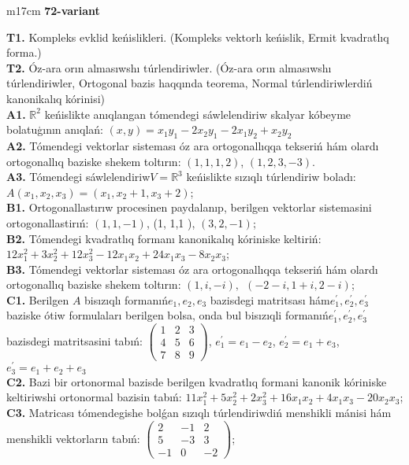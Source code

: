 \documentclass{article}
\begin{document}
\begin{tabular}{m{17cm}}
\textbf{72-variant}
\newline

\textbf{T1.} Kompleks evklid keńislikleri.  (Kompleks vektorlı keńislik, Ermit kvadratlıq forma.) \\
\textbf{T2.} Óz-ara orın almasıwshı túrlendiriwler. (Óz-ara orın almasıwshı túrlendiriwler,  Ortogonal bazis haqqında teorema,  Normal túrlendiriwlerdiń kanonikalıq kórinisi) \\
\textbf{A1.} \(\mathbb{R}^{2}\) keńislikte anıqlangan tómendegi sáwlelendiriw skalyar kóbeyme bolatuģının anıqlań: \((x,y) = x_{1}y_{1} - 2x_{2}y_{1} - 2x_{1}y_{2} + x_{2}y_{2}\) \\
\textbf{A2.} Tómendegi vektorlar sisteması óz ara ortogonallıqqa tekseriń hám olardı ortogonallıq baziske shekem toltırın: \((1,1,1,2)\), \((1,2,3, - 3)\). \\
\textbf{A3.} Tómendegi sáwlelendiriw\(V = \mathbb{R}^{3}\) keńislikte sızıqlı túrlendiriw boladı: \(A\left( x_{1},x_{2},x_{3} \right) = \left( x_{1},x_{2} + 1,x_{3} + 2 \right)\); \\
\textbf{B1.} Ortogonallastırıw procesinen paydalanıp, berilgen vektorlar sistemasini ortogonallastirıń: \((1,1, - 1)\), (1, 1,1 ), \((3,2, - 1)\); \\
\textbf{B2.} Tómendegi kvadratlıq formanı kanonikalıq kóriniske keltiriń: \(12x_{1}^{2} + 3x_{2}^{2} + 12x_{3}^{2} - 12x_{1}x_{2} + 24x_{1}x_{3} - 8x_{2}x_{3}\); \\
\textbf{B3.} Tómendegi vektorlar sisteması óz ara ortogonallıqqa tekseriń hám olardı ortogonallıq baziske shekem toltırın: \((1,i, - i),\ \ ( - 2 - i,1 + i,2 - i)\); \\
\textbf{C1.} Berilgen \(A\) bisızıqlı formanıń\(e_{1},e_{2},e_{3}\) bazisdegi matritsası hám\(e_{1}^{'},e_{2}^{'},e_{3}^{'}\) baziske ótiw formulaları berilgen bolsa, onda bul bisızıqli formanıń\(e_{1}^{'},e_{2}^{'},e_{3}^{'}\) bazisdegi matritsasini tabıń: \(\begin{pmatrix} 1 & 2 & 3 \\ 4 & 5 & 6 \\ 7 & 8 & 9 \end{pmatrix}\), \(e_{1}^{'} = e_{1} - e_{2}\), \(e_{2}^{'} = e_{1} + e_{3}\), \(e_{3}^{'} = e_{1} + e_{2} + e_{3}\) \\
\textbf{C2.} Bazi bir ortonormal bazisde berilgen kvadratlıq formani kanonik kóriniske keltiriwshi ortonormal bazisin tabıń: \(11x_{1}^{2} + 5x_{2}^{2} + 2x_{3}^{2} + 16x_{1}x_{2} + 4x_{1}x_{3} - 20x_{2}x_{3}\); \\
\textbf{C3.} Matricası tómendegishe bolǵan sızıqlı túrlendiriwdiń menshikli mánisi hám menshikli vektorların tabıń: \(\begin{pmatrix} 2 & - 1 & 2 \\ 5 & - 3 & 3 \\  - 1 & 0 & - 2 \end{pmatrix}\); \\

\end{tabular}
\vspace{1cm}
\end{document}

